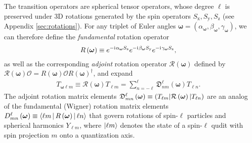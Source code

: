 \documentclass[notitlepage,twocolumn]{revtex4-2}
\newcommand{\p}[1]{\left(#1\right)} %
\newcommand{\bk}{\Braket} %
\renewcommand{\v}{\bm} %
\renewcommand{\i}{\mathrm{i}\mkern1mu} %
\newcommand{\1}{\mathds{1}}
\newcommand{\x}{\text{x}}
\newcommand{\y}{\text{y}}
\newcommand{\z}{\text{z}}
\renewcommand{\O}{\mathcal{O}}
\newcommand{\R}{\mathcal{R}}
\newcommand{\D}{\mathfrak{D}}
\def\obk#1{\mathinner{({#1})}}
\begin{document}
The transition operators are spherical tensor operators, whose degree $\ell$ is preserved under 3D rotations generated by the spin operators $S_\x,S_\y,S_\z$ (see Appendix \ref{sec:rotations}).
For any triplet of Euler angles $\v\omega=\p{\alpha_{\v\omega},\beta_{\v\omega},\gamma_{\v\omega}}$, we can therefore define the {\it fundamental} rotation operator
\begin{align}
  R\p{\v\omega} \equiv e^{-\i\alpha_{\v\omega}S_\z} e^{-\i\beta_{\v\omega}S_\y} e^{-\i\gamma_{\v\omega}S_\z},
  \label{eq:rot_op}
\end{align}
as well as the corresponding {\it adjoint} rotation operator $\R\p{\v\omega}$ defined by $\R\p{\v\omega}\O = R\p{\v\omega} \O R\p{\v\omega}^\dag$, and expand
\begin{align}
  T_{\v\omega\ell m} \equiv
  \R\p{\v\omega} T_{\ell m}
  = \sum_{n=-\ell}^\ell \D_{nm}^\ell\p{\v\omega} T_{\ell n}.
  \label{eq:trans_rot}
\end{align}
The adjoint rotation matrix elements $\D_{mn}^\ell\p{\v\omega}\equiv\obk{T_{\ell m}|\R\p{\v\omega}|T_{\ell n}}$ are an analog of the fundamental (Wigner) rotation matrix elements $D_{mn}^\ell\p{\v\omega}\equiv\bk{\ell m|R\p{\v\omega}|\ell n}$ that govern rotations of spin-$\ell$ particles and spherical harmonics $Y_{\ell m}$, where $\ket{\ell m}$ denotes the state of a spin-$\ell$ qudit with spin projection $m$ onto a quantization axis.
\end{document}
